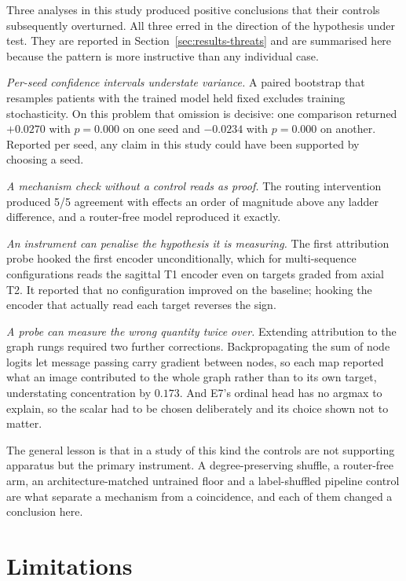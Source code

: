 \documentclass[12pt,a4paper]{report}
\begin{document}
Three analyses in this study produced positive conclusions that their controls
subsequently overturned. All three erred in the direction of the hypothesis
under test. They are reported in Section~\ref{sec:results-threats} and are
summarised here because the pattern is more instructive than any individual
case.

\emph{Per-seed confidence intervals understate variance.} A paired bootstrap
that resamples patients with the trained model held fixed excludes training
stochasticity. On this problem that omission is decisive: one comparison
returned $+0.0270$ with $p = 0.000$ on one seed and $-0.0234$ with $p = 0.000$
on another. Reported per seed, any claim in this study could have been supported
by choosing a seed.

\emph{A mechanism check without a control reads as proof.} The routing
intervention produced 5/5 agreement with effects an order of magnitude above any
ladder difference, and a router-free model reproduced it exactly.

\emph{An instrument can penalise the hypothesis it is measuring.} The first
attribution probe hooked the first encoder unconditionally, which for
multi-sequence configurations reads the sagittal T1 encoder even on targets
graded from axial T2. It reported that no configuration improved on the
baseline; hooking the encoder that actually read each target reverses the sign.

\emph{A probe can measure the wrong quantity twice over.} Extending attribution
to the graph rungs required two further corrections. Backpropagating the sum of
node logits let message passing carry gradient between nodes, so each map
reported what an image contributed to the whole graph rather than to its own
target, understating concentration by $0.173$. And E7's ordinal head has no
argmax to explain, so the scalar had to be chosen deliberately and its choice
shown not to matter.

The general lesson is that in a study of this kind the controls are not
supporting apparatus but the primary instrument. A degree-preserving shuffle, a
router-free arm, an architecture-matched untrained floor and a label-shuffled
pipeline control are what separate a mechanism from a coincidence, and each of
them changed a conclusion here.

\section{Limitations}
\label{sec:disc-limits}
\end{document}
